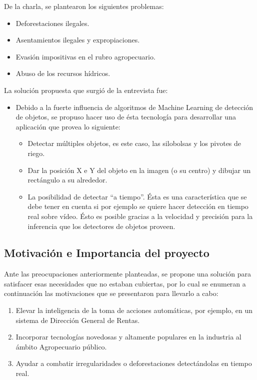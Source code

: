 De la charla, se plantearon los siguientes problemas:
\begin{itemize}
    \item Deforestaciones ilegales.
    \item Asentamientos ilegales y expropiaciones.
    \item Evasión impositivas en el rubro agropecuario.
    \item Abuso de los recursos hídricos.
\end{itemize}

La solución propuesta que surgió de la entrevista fue:
\begin{itemize}
    \item Debido a la fuerte influencia de algoritmos de Machine Learning de detección de objetos, se propuso hacer uso de ésta tecnología para desarrollar una aplicación que provea lo siguiente:
    \begin{itemize}
        \item Detectar múltiples objetos, es este caso, las silobolsas y los pivotes de riego.
        \item Dar la posición X e Y del objeto en la imagen (o su centro) y dibujar un rectángulo a su alrededor.
        \item La posibilidad de detectar “a tiempo”.  Ésta es una característica que se debe tener en cuenta si por ejemplo se quiere hacer detección en tiempo real sobre vídeo. Ésto es posible gracias a la velocidad y precisión para la inferencia que los detectores de objetos proveen.
    \end{itemize}
\end{itemize}

\subsection{Motivación e Importancia del proyecto}

Ante las preocupaciones anteriormente planteadas, se propone una solución para satisfacer esas necesidades que no estaban cubiertas, por lo cual se enumeran a continuación las motivaciones que se presentaron para llevarlo a cabo:

\begin{enumerate}
    \item Elevar la inteligencia de la toma de acciones automáticas, por ejemplo, en un sistema de Dirección General de Rentas.
    \item Incorporar tecnologías novedosas y altamente populares en la industria al ámbito Agropecuario público.
    \item Ayudar a combatir irregularidades o deforestaciones detectándolas en tiempo real.
\end{enumerate}

